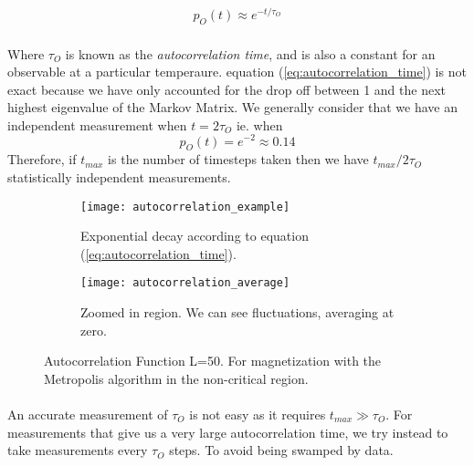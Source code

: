 \documentclass[12pt] {report} %
\begin{document}
			\begin{align}
				p_O(t) \approx e^{-t/\tau_O}	\label{eq:autocorrelation_time}
			\end{align}		
			
			\paragraph{}
				Where $\tau_O$ is known as the \textit{autocorrelation time}, and is also a constant for an observable at a particular temperaure. equation (\ref{eq:autocorrelation_time}) is not exact because we have only accounted for the drop off between 1 and the next highest eigenvalue of the Markov Matrix. We generally consider that we have an independent measurement when $t = 2\tau_O$ ie. when $$p_O(t) = e^{-2} \approx 0.14$$ Therefore, if $t_{max}$ is the number of timesteps taken then we have $t_{max}/2 \tau_O$ statistically independent measurements.
				
			\begin{figure}[H]
				\centering
			\hspace*{\fill}
			\begin{subfigure}[h]{0.49\textwidth}
				\centering
				\texttt{[image: autocorrelation\_example]}
				\caption{Exponential decay according to equation (\ref{eq:autocorrelation_time}).}
				\label{fig:autocorrelation_example}
			\end{subfigure}
			\hfill	
			\begin{subfigure}[h]{0.49\textwidth}
				\centering
				\texttt{[image: autocorrelation\_average]}
				\caption{Zoomed in region. We can see fluctuations, averaging at zero.}
				\label{fig:autocorrelation_average}
			\end{subfigure}
			\hspace*{\fill}
				\caption{Autocorrelation Function L=50. For magnetization with the Metropolis algorithm in the non-critical region.}
				\label{fig:autocorrelation_examples}
			\end{figure}
				
			\paragraph{}
				An accurate measurement of $\tau_O$ is not easy as it requires $t_{max} \gg \tau_O$. For measurements that give us a very large autocorrelation time, we try instead to take measurements every $\tau_{O}$ steps. To avoid being swamped by data.
			
\end{document}
